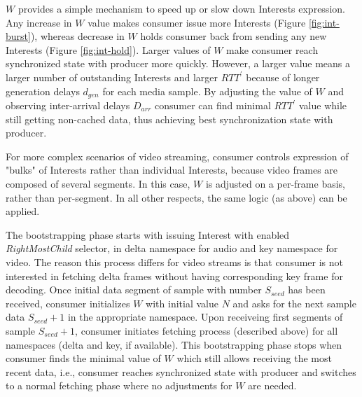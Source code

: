 \documentclass{icn/sig-alternate-2012} %
\begin{document}
$W$ provides a simple mechanism to speed up or slow down Interests expression. Any increase in $W$ value makes consumer issue more Interests (Figure \ref{fig:int-burst}), whereas decrease in $W$ holds consumer back from sending any new Interests (Figure \ref{fig:int-hold}). Larger values of $W$ make consumer reach synchronized state with producer more quickly. However, a larger value means a larger number of outstanding Interests and larger $RTT^\prime$ because of longer generation delays $d_{gen}$ for each media sample. By adjusting the value of $W$ and observing inter-arrival delays $D_{arr}$ consumer can find minimal $RTT^\prime$ value while still getting non-cached data, thus achieving best synchronization state with producer.

For more complex scenarios of video streaming, consumer controls expression of "bulks" of Interests rather than individual Interests, because video frames are composed of several segments. In this case, $W$ is adjusted on a per-frame basis, rather than per-segment. In all other respects, the same logic (as above) can be applied.

The bootstrapping phase starts with issuing Interest with enabled \textit{RightMostChild} selector, in delta namespace for audio and key namespace for video. The reason this process differs for video streams is that consumer is not interested in fetching delta frames without having corresponding key frame for decoding. Once initial data segment of sample with number $S_{seed}$ has been received, consumer initializes $W$ with initial value $N$ and asks for the next sample data $S_{seed}+1$ in the appropriate namespace. Upon receiveing first segments of sample $S_{seed}+1$, consumer initiates fetching process (described above) for all namespaces (delta and key, if available). This bootstrapping phase stops when consumer finds the minimal value of $W$ which still allows receiving the most recent data, i.e., consumer reaches synchronized state with producer and switches to a normal fetching phase where no adjustments for $W$ are needed. 



\end{document}
